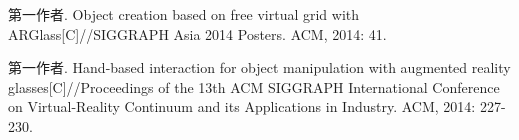 
\begin{publications}{99}

    \item\textsc{第一作者}. {Object creation based on free virtual grid with ARGlass}[C]//SIGGRAPH Asia 2014 Posters. ACM, 2014: 41.

    \item\textsc{第一作者}. {Hand-based interaction for object manipulation with augmented reality glasses}[C]//Proceedings of the 13th ACM SIGGRAPH International Conference on Virtual-Reality Continuum and its Applications in Industry. ACM, 2014: 227-230.
    
\end{publications}
